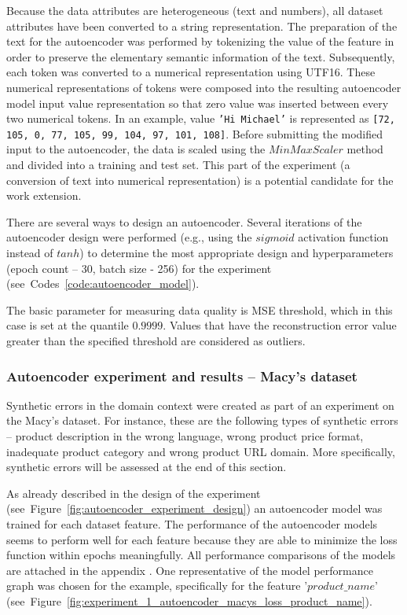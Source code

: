 				Because the data attributes are heterogeneous (text and numbers), all dataset attributes have been converted to a string representation. The preparation of the text for the autoencoder was performed by tokenizing the value of the feature in order to preserve the elementary semantic information of the text. Subsequently, each token was converted to a numerical representation using UTF16. These numerical representations of tokens were composed into the resulting autoencoder model input value representation so that zero value was inserted between every two numerical tokens. In an example, value \texttt{'Hi Michael'} is represented as \texttt{[72, 105, 0, 77, 105, 99, 104, 97, 101, 108]}. Before submitting the modified input to the autoencoder, the data is scaled using the $MinMaxScaler$ method and divided into a training and test set. This part of the experiment (a conversion of text into numerical representation) is a potential candidate for the work extension.
				
				There are several ways to design an autoencoder. Several iterations of the autoencoder design were performed (e.g., using the $sigmoid$ activation function instead of $tanh$) to determine the most appropriate design and hyperparameters (epoch count -- 30, batch size - 256) for the experiment (see~Codes~\ref{code:autoencoder_model}).
				
					
				The basic parameter for measuring data quality is MSE threshold, which in this case is set at the quantile $0.9999$.	Values that have the reconstruction error value greater than the specified threshold are considered as outliers.	
										
				\subsubsection{Autoencoder experiment and results -- Macy's dataset}
				
					Synthetic errors in the domain context were created as part of an experiment on the Macy's dataset. For instance, these are the following types of synthetic errors -- product description in the wrong language, wrong product price format, inadequate product category and wrong product URL domain. More specifically, synthetic errors will be assessed at the end of this section.
					
					As already described in the design of the experiment (see~Figure~\ref{fig:autoencoder_experiment_design}) an autoencoder model was trained for each dataset feature. The performance of the autoencoder models seems to perform well for each feature because they are able to minimize the loss function within epochs meaningfully. All performance comparisons of the models are attached in the appendix . One representative of the model performance graph was chosen for the example, specifically for the feature '$product\_name$' (see~Figure~\ref{fig:experiment_1_autoencoder_macys_loss_product_name}).


